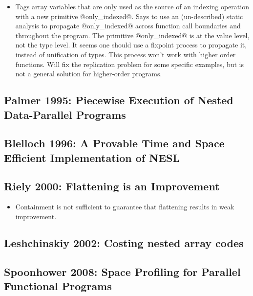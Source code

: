 \begin{itemize}
\item	Tags array variables that are only used as the source of an indexing operation with a new primitive @only_indexed@. Says to use an (un-described) static analysis to propagate @only_indexed@ across function call boundaries and throughout the program. The primitive @only_indexed@ is at the value level, not the type level. It seems one should use a fixpoint process to propagate it, instead of unification of types. This process won't work with higher order functions. Will fix the replication problem for some specific examples, but is not a general solution for higher-order programs.
\end{itemize}


\subsection{Palmer 1995: Piecewise Execution of Nested Data-Parallel Programs}


\subsection{Blelloch 1996: A Provable Time and Space Efficient Implementation of NESL}


\subsection{Riely 2000: Flattening is an Improvement}
\begin{itemize}
\item   Containment is not sufficient to guarantee that flattening results in weak improvement.
\end{itemize}



\subsection{Leshchinskiy 2002: Costing nested array codes}

\subsection{Spoonhower 2008: Space Profiling for Parallel Functional Programs}




